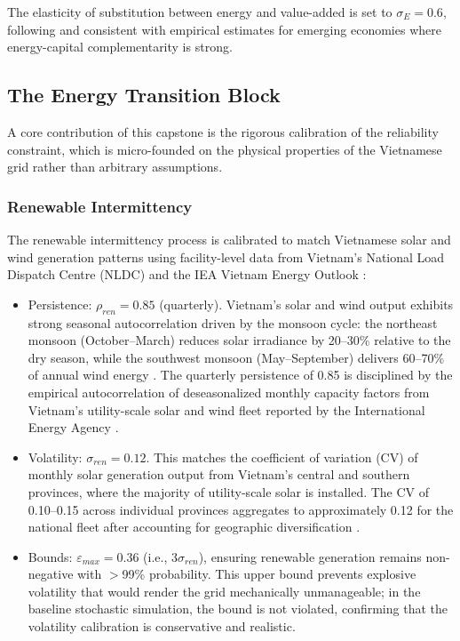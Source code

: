 \documentclass[12pt, a4paper]{article}
\begin{document}
	The elasticity of substitution between energy and value-added is set to $\sigma_E = 0.6$, following \citet{heutel2012} and consistent with empirical estimates for emerging economies where energy-capital complementarity is strong.
	
	\subsection{The Energy Transition Block}
	
	A core contribution of this capstone is the rigorous calibration of the reliability constraint, which is micro-founded on the physical properties of the Vietnamese grid rather than arbitrary assumptions.
	
	\subsubsection{Renewable Intermittency}
	
	The renewable intermittency process is calibrated to match Vietnamese solar and wind generation patterns using facility-level data from Vietnam's National Load Dispatch Centre (NLDC) and the IEA Vietnam Energy Outlook \citep{iea2023}:
	
	\begin{itemize}
		\item Persistence: $\rho_{ren} = 0.85$ (quarterly). Vietnam's solar and wind output exhibits strong seasonal autocorrelation driven by the monsoon cycle: the northeast monsoon (October--March) reduces solar irradiance by 20--30\% relative to the dry season, while the southwest monsoon (May--September) delivers 60--70\% of annual wind energy \citep{nguyenle2019}. The quarterly persistence of 0.85 is disciplined by the empirical autocorrelation of deseasonalized monthly capacity factors from Vietnam's utility-scale solar and wind fleet reported by the International Energy Agency \citep{iea2023}.
		\item Volatility: $\sigma_{ren} = 0.12$. This matches the coefficient of variation (CV) of monthly solar generation output from Vietnam's central and southern provinces, where the majority of utility-scale solar is installed. The CV of 0.10--0.15 across individual provinces aggregates to approximately 0.12 for the national fleet after accounting for geographic diversification \citep{gso2024}.
		\item Bounds: $\varepsilon_{max} = 0.36$ (i.e., $3\sigma_{ren}$), ensuring renewable generation remains non-negative with $>$99\% probability. This upper bound prevents explosive volatility that would render the grid mechanically unmanageable; in the baseline stochastic simulation, the bound is not violated, confirming that the volatility calibration is conservative and realistic.
	\end{itemize}
	
\end{document}
